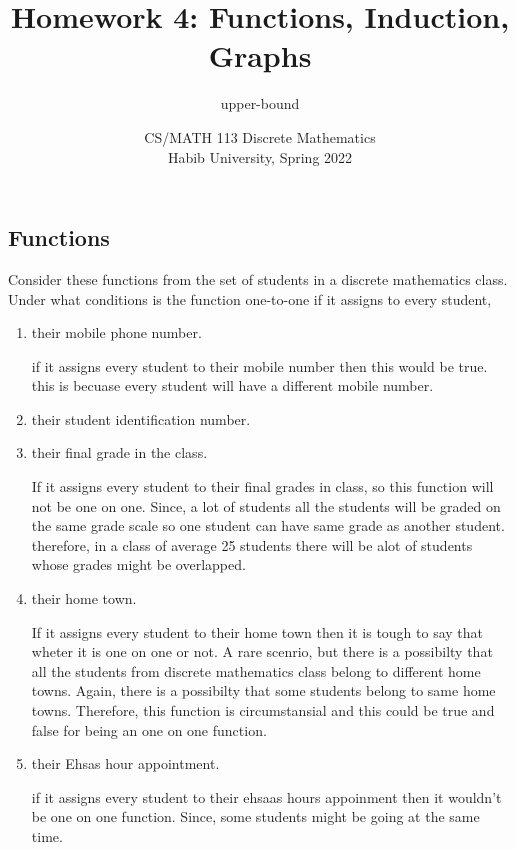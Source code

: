 \documentclass[addpoints]{exam}
\title{Homework 4: Functions, Induction, Graphs}
\author{upper-bound}  %
\date{CS/MATH 113 Discrete Mathematics\\Habib University, Spring 2022}
\begin{document}
\maketitle

\begin{questions}

  \section*{Functions}
  
\question[5] Consider these functions from the set of students in a discrete mathematics class. Under what conditions is the
  function one-to-one if it assigns to every student,
  
  \begin{enumerate}[label=\alph*)]
  \item their mobile phone number.
    \begin{solution}
      if it assigns every student to their mobile number then this would be true. this is becuase every student will have a different mobile number.
    \end{solution}
  \item their student identification number.
  \item their final grade in the class.
    \begin{solution}
      If it assigns every student to their final grades in class, so this function will not be one on one. Since, a lot of students all the students
      will be graded on the same grade scale so one student can have same grade as another student. therefore, in a class of average 25 students there will be alot of students
      whose grades might be overlapped.
    \end{solution}
  \item their home town.
    \begin{solution}
      If it assigns every student to their home town then it is tough to say that wheter it is one on one or not. A rare scenrio, but there is a possibilty that all the students
      from discrete mathematics class belong to different home towns. Again, there is a possibilty that some students belong to same home towns. Therefore, this function is circumstansial and this could
      be true and false for being an one on one function.
    \end{solution}
  \item their Ehsas hour appointment.
    \begin{solution}
      if it assigns every student to their ehsaas hours appoinment then it wouldn't be one on one function. Since, some students might be going at the same time.
    \end{solution}
  \end{enumerate}



\end{questions}
\end{document}
